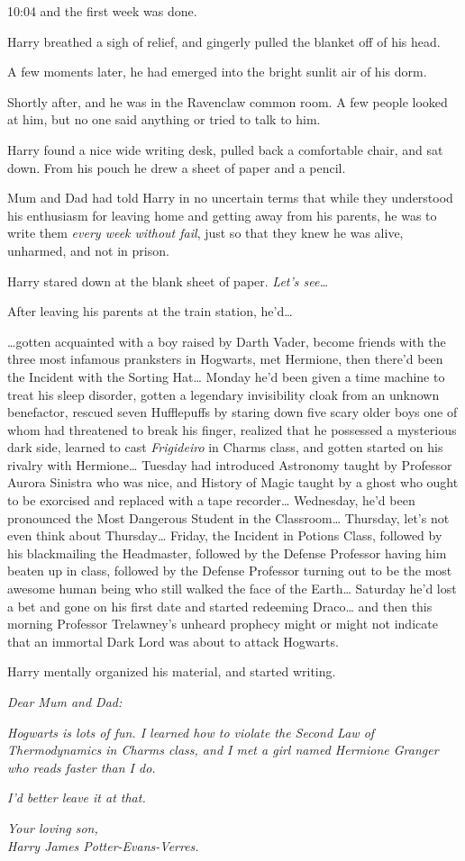 10:04 and the first week was done.

Harry breathed a sigh of relief, and gingerly pulled the blanket off of his 
head.

A few moments later, he had emerged into the bright sunlit air of his dorm.

Shortly after, and he was in the Ravenclaw common room. A few people looked at 
him, but no one said anything or tried to talk to him.

Harry found a nice wide writing desk, pulled back a comfortable chair, and sat 
down. From his pouch he drew a sheet of paper and a pencil.

Mum and Dad had told Harry in no uncertain terms that while they understood his 
enthusiasm for leaving home and getting away from his parents, he was to write 
them \emph{every week without fail}, just so that they knew he was alive, 
unharmed, and not in prison.

Harry stared down at the blank sheet of paper. \emph{Let's see{\ldots}}

After leaving his parents at the train station, he'd{\ldots}

{\ldots}gotten acquainted with a boy raised by Darth Vader, become friends with 
the three most infamous pranksters in Hogwarts, met Hermione, then there'd been 
the Incident with the Sorting Hat{\ldots} Monday he'd been given a time machine 
to treat his sleep disorder, gotten a legendary invisibility cloak from an 
unknown benefactor, rescued seven Hufflepuffs by staring down five scary older 
boys one of whom had threatened to break his finger, realized that he possessed 
a mysterious dark side, learned to cast \emph{Frigideiro} in Charms class, and 
gotten started on his rivalry with Hermione{\ldots} Tuesday had introduced 
Astronomy taught by Professor Aurora Sinistra who was nice, and History of 
Magic taught by a ghost who ought to be exorcised and replaced with a tape 
recorder{\ldots} Wednesday, he'd been pronounced the Most Dangerous Student in 
the Classroom{\ldots} Thursday, let's not even think about Thursday{\ldots} 
Friday, the Incident in Potions Class, followed by his blackmailing the 
Headmaster, followed by the Defense Professor having him beaten up in class, 
followed by the Defense Professor turning out to be the most awesome human 
being who still walked the face of the Earth{\ldots} Saturday he'd lost a bet 
and gone on his first date and started redeeming Draco{\ldots} and then this 
morning Professor Trelawney's unheard prophecy might or might not indicate that 
an immortal Dark Lord was about to attack Hogwarts.

Harry mentally organized his material, and started writing.

\emph{Dear Mum and Dad:}

\emph{Hogwarts is lots of fun. I learned how to violate the Second Law of 
Thermodynamics in Charms class, and I met a girl named Hermione Granger who 
reads faster than I do.}

\emph{I'd better leave it at that.}

\emph{Your loving son,\\
Harry James Potter-Evans-Verres.}